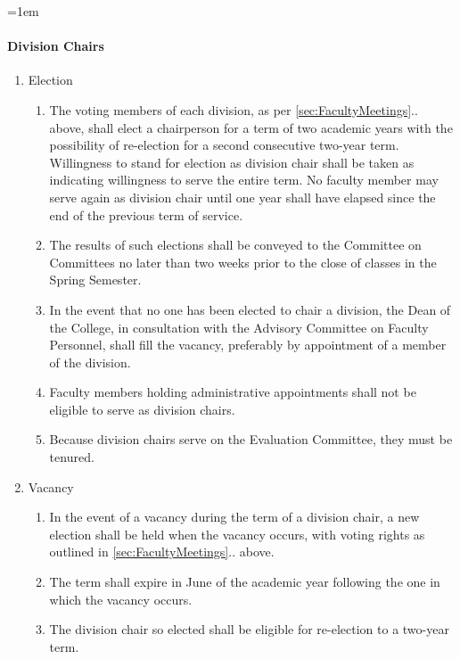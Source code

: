 \documentclass{manual}
\let\oldparagraph\paragraph
\renewcommand\paragraph{\leftskip=1em\oldparagraph}
\newcommand{\itemLevelA}{\alph*.}
\newcommand{\itemLevelB}{\arabic*)}
\newcommand{\itemRefA}{\alph*}
\newcommand{\itemRefB}{\arabic*}
\begin{document}
\paragraph{Division Chairs}\label{par:DivisionChairs}
\begin{enumerate}[label=\itemLevelA,ref=\itemRefA]
\item Election
\begin{enumerate}[label=\itemLevelB,ref=\itemRefB]
\item The voting members of each division, as per \cref{sec:FacultyMeetings}.. above, shall elect a chairperson for a term of two academic years with the possibility of re-election for a second consecutive two-year term. Willingness to stand for election as division chair shall be taken as indicating willingness to serve the entire term. No faculty member may serve again as division chair until one year shall have elapsed since the end of the previous term of service.
\item The results of such elections shall be conveyed to the Committee on Committees no later than two weeks prior to the close of classes in the Spring Semester.
\item In the event that no one has been elected to chair a division, the Dean of the College, in consultation with the Advisory Committee on Faculty Personnel, shall fill the vacancy, preferably by appointment of a member of the division.
\item Faculty members holding administrative appointments shall not be eligible to serve as division chairs.
\item  Because division chairs serve on the Evaluation Committee, they must be tenured.
\end{enumerate}

\item Vacancy
\begin{enumerate}[label=\itemLevelB,ref=\itemRefB]
\item In the event of a vacancy during the term of a division chair, a new election shall be held when the vacancy occurs, with voting rights as outlined in \cref{sec:FacultyMeetings}.. above.
\item The term shall expire in June of the academic year following the one in which the vacancy occurs.
\item The division chair so elected shall be eligible for re-election to a two-year term. 
\end{enumerate}


\end{enumerate}
\end{document}
